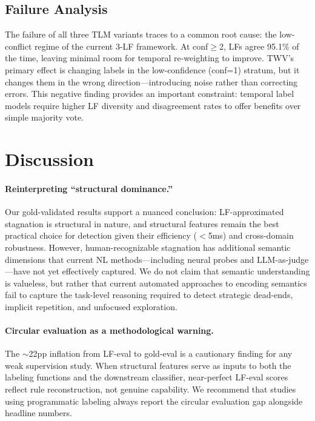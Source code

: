 \documentclass[11pt]{article}
\begin{document}
\subsection{Failure Analysis}

The failure of all three TLM variants traces to a common root cause: the low-conflict regime of the current 3-LF framework. At conf$\geq$2, LFs agree 95.1\% of the time, leaving minimal room for temporal re-weighting to improve. TWV's primary effect is changing labels in the low-confidence (conf=1) stratum, but it changes them in the wrong direction---introducing noise rather than correcting errors. This negative finding provides an important constraint: temporal label models require higher LF diversity and disagreement rates to offer benefits over simple majority vote.

\section{Discussion}
\label{sec:discussion}

\paragraph{Reinterpreting ``structural dominance.''}
Our gold-validated results support a nuanced conclusion: LF-approximated stagnation is structural in nature, and structural features remain the best practical choice for detection given their efficiency ($<$5ms) and cross-domain robustness. However, human-recognizable stagnation has additional semantic dimensions that current NL methods---including neural probes and LLM-as-judge---have not yet effectively captured. We do not claim that semantic understanding is valueless, but rather that current automated approaches to encoding semantics fail to capture the task-level reasoning required to detect strategic dead-ends, implicit repetition, and unfocused exploration.

\paragraph{Circular evaluation as a methodological warning.}
The $\sim$22pp inflation from LF-eval to gold-eval is a cautionary finding for any weak supervision study. When structural features serve as inputs to both the labeling functions and the downstream classifier, near-perfect LF-eval scores reflect rule reconstruction, not genuine capability. We recommend that studies using programmatic labeling always report the circular evaluation gap alongside headline numbers.
\end{document}
